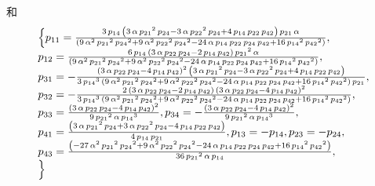 和
\begin{equation}
\renewcommand{\arraystretch}{1.2}
\begin{array}{l}
\dbrace{
{{p}_{11}}=\frac{3\,{{p}_{14}}\,\left( 3\,\alpha\,{{{p}_{21}}}^{2}\,{{p}_{24}}-3\,\alpha\,{{{p}_{22}}}^{2}\,{{p}_{24}}+4\,{{p}_{14}}\,{{p}_{22}}\,{{p}_{42}}\right) \,{{p}_{21}}\,\alpha}{\left( 9\,{\alpha}^{2}\,{{{p}_{21}}}^{2}\,{{{p}_{24}}}^{2}+9\,{\alpha}^{2}\,{{{p}_{22}}}^{2}\,{{{p}_{24}}}^{2}-24\,\alpha\,{{p}_{14}}\,{{p}_{22}}\,{{p}_{24}}\,{{p}_{42}}+16\,{{{p}_{14}}}^{2}\,{{{p}_{42}}}^{2}\right) },\\ 
{{p}_{12}}=\frac{6\,{{p}_{14}}\,\left( 3\,\alpha\,{{p}_{22}}\,{{p}_{24}}-2\,{{p}_{14}}\,{{p}_{42}}\right) \,{{{p}_{21}}}^{2}\,\alpha}{\left( 9\,{\alpha}^{2}\,{{{p}_{21}}}^{2}\,{{{p}_{24}}}^{2}+9\,{\alpha}^{2}\,{{{p}_{22}}}^{2}\,{{{p}_{24}}}^{2}-24\,\alpha\,{{p}_{14}}\,{{p}_{22}}\,{{p}_{24}}\,{{p}_{42}}+16\,{{{p}_{14}}}^{2}\,{{{p}_{42}}}^{2}\right) },\\
{{p}_{31}}=-\frac{\left( 3\,\alpha\,{{p}_{22}}\,{{p}_{24}}-4\,{{p}_{14}}\,{{p}_{42}}\right) ^{2}\,\left( 3\,\alpha\,{{{p}_{21}}}^{2}\,{{p}_{24}}-3\,\alpha\,{{{p}_{22}}}^{2}\,{{p}_{24}}+4\,{{p}_{14}}\,{{p}_{22}}\,{{p}_{42}}\right) }{3\,{{{p}_{14}}}^{3}\,\left( 9\,{\alpha}^{2}\,{{{p}_{21}}}^{2}\,{{{p}_{24}}}^{2}+9\,{\alpha}^{2}\,{{{p}_{22}}}^{2}\,{{{p}_{24}}}^{2}-24\,\alpha\,{{p}_{14}}\,{{p}_{22}}\,{{p}_{24}}\,{{p}_{42}}+16\,{{{p}_{14}}}^{2}\,{{{p}_{42}}}^{2}\right) \,{{p}_{21}}},\\
{{p}_{32}}=-\frac{2\,\left( 3\,\alpha\,{{p}_{22}}\,{{p}_{24}}-2\,{{p}_{14}}\,{{p}_{42}}\right) \,\left( 3\,\alpha\,{{p}_{22}}\,{{p}_{24}}-4\,{{p}_{14}}\,{{p}_{42}}\right) ^{2}}{3\,{{{p}_{14}}}^{3}\,\left( 9\,{\alpha}^{2}\,{{{p}_{21}}}^{2}\,{{{p}_{24}}}^{2}+9\,{\alpha}^{2}\,{{{p}_{22}}}^{2}\,{{{p}_{24}}}^{2}-24\,\alpha\,{{p}_{14}}\,{{p}_{22}}\,{{p}_{24}}\,{{p}_{42}}+16\,{{{p}_{14}}}^{2}\,{{{p}_{42}}}^{2}\right) },\\ 
{{p}_{33}}=\frac{\left( 3\,\alpha\,{{p}_{22}}\,{{p}_{24}}-4\,{{p}_{14}}\,{{p}_{42}}\right) ^{2}}{9\,{{{p}_{21}}}^{2}\,\alpha\,{{{p}_{14}}}^{3}},
{{p}_{34}}=-\frac{\left( 3\,\alpha\,{{p}_{22}}\,{{p}_{24}}-4\,{{p}_{14}}\,{{p}_{42}}\right) ^{2}}{9\,{{{p}_{21}}}^{2}\,\alpha\,{{{p}_{14}}}^{3}},\\ 
{{p}_{41}}=\frac{\left( 3\,\alpha\,{{{p}_{21}}}^{2}\,{{p}_{24}}+3\,\alpha\,{{{p}_{22}}}^{2}\,{{p}_{24}}-4\,{{p}_{14}}\,{{p}_{22}}\,{{p}_{42}}\right) }{4\,{{p}_{14}}\,{{p}_{21}}},
{{p}_{13}}=-{{p}_{14}},
{{p}_{23}}=-{{p}_{24}},\\ 
{{p}_{43}}=\frac{\left( -27\,{\alpha}^{2}\,{{{p}_{21}}}^{2}\,{{{p}_{24}}}^{2}+9\,{\alpha}^{2}\,{{{p}_{22}}}^{2}\,{{{p}_{24}}}^{2}-24\,\alpha\,{{p}_{14}}\,{{p}_{22}}\,{{p}_{24}}\,{{p}_{42}}+16\,{{{p}_{14}}}^{2}\,{{{p}_{42}}}^{2}\right) }{36\,{{{p}_{21}}}^{2}\,\alpha\,{{p}_{14}}},\\ 
}
\end{array}
\end{equation}

